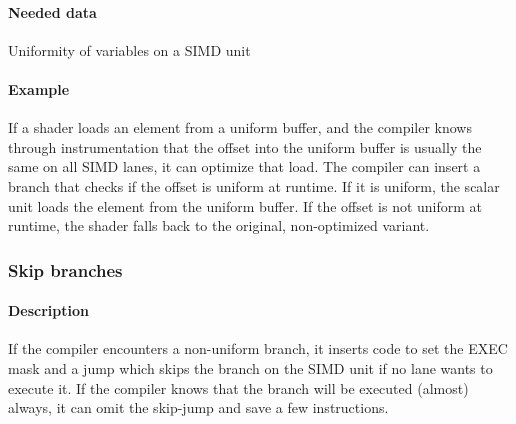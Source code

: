 \paragraph{Needed data} Uniformity of variables on a SIMD unit
\paragraph{Example} If a shader loads an element from a uniform buffer, and the compiler knows through instrumentation that the offset into the uniform buffer is usually the same on all SIMD lanes, it can optimize that load.
The compiler can insert a branch that checks if the offset is uniform at runtime. If it is uniform, the scalar unit loads the element from the uniform buffer.
If the offset is not uniform at runtime, the shader falls back to the original, non-optimized variant.

\subsubsection{Skip branches}
\paragraph{Description} If the compiler encounters a non-uniform branch, it inserts code to set the EXEC mask and a jump which skips the branch on the SIMD unit if no lane wants to execute it. If the compiler knows that the branch will be executed (almost) always, it can omit the skip-jump and save a few instructions.
